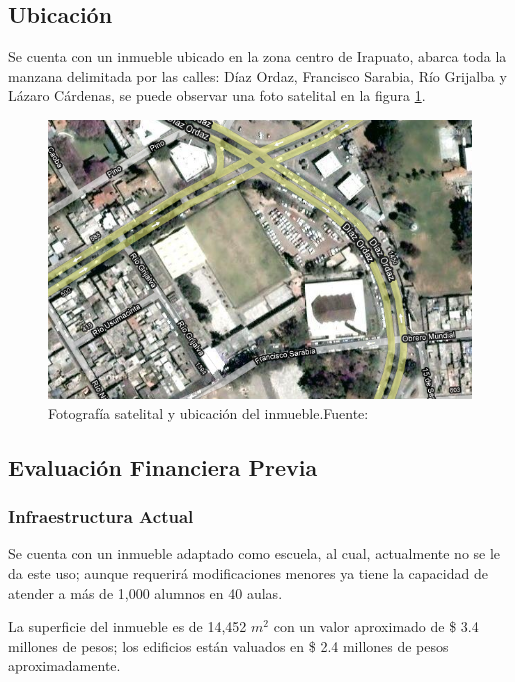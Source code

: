 \subsection{Ubicación}

Se cuenta con un inmueble ubicado en la zona centro de Irapuato, abarca toda la manzana delimitada por las calles: Díaz Ordaz, Francisco Sarabia, Río Grijalba y Lázaro Cárdenas, se puede observar una foto satelital en la figura \ref{fig:ubicacion}.

\begin{figure}
	\centering
	\includegraphics[scale=0.5]{images/localizacion}
	\caption[Fotografía satelital y ubicación del inmueble.]{Fotografía satelital y ubicación del inmueble.\newline Fuente: \citep{GoogleMaps2010}}
	\label{fig:ubicacion}
\end{figure}

\subsection{Evaluación Financiera Previa}

\subsubsection{Infraestructura Actual}

Se cuenta con un inmueble adaptado como escuela, al cual, actualmente no se le da este uso; aunque requerirá modificaciones menores ya tiene la capacidad de atender a más de 1,000 alumnos en 40 aulas.

La superficie del inmueble es de 14,452 $m^2$ con un valor aproximado de \$ 3.4 millones de pesos; los edificios están valuados en \$ 2.4 millones de pesos aproximadamente.


